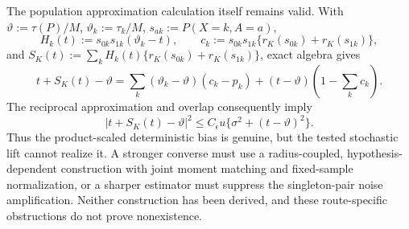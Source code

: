 The population approximation calculation itself remains valid.  With \(\vartheta:=\tau(P)/M\), \(\vartheta_k:=\tau_k/M\), \(s_{ak}:=P(X=k,A=a)\),
\[
 H_k(t):=s_{0k}s_{1k}(\vartheta_k-t),
 \qquad
 c_k:=s_{0k}s_{1k}\{r_K(s_{0k})+r_K(s_{1k})\},
\]
and \(S_K(t):=\sum_kH_k(t)\{r_K(s_{0k})+r_K(s_{1k})\}\), exact algebra gives
\[
 t+S_K(t)-\vartheta
 =\sum_k(\vartheta_k-\vartheta)(c_k-p_k)
 +(t-\vartheta)\left(1-\sum_kc_k\right).
\]
The reciprocal approximation and overlap consequently imply
\[
 |t+S_K(t)-\vartheta|^2
 \le C_{\epsilon}u\{\sigma^2+(t-\vartheta)^2\}.
\tag{4}
\]
Thus the product-scaled deterministic bias is genuine, but the tested stochastic lift cannot realize it.  A stronger converse must use a radius-coupled, hypothesis-dependent construction with joint moment matching and fixed-sample normalization, or a sharper estimator must suppress the singleton-pair noise amplification.  Neither construction has been derived, and these route-specific obstructions do not prove nonexistence.